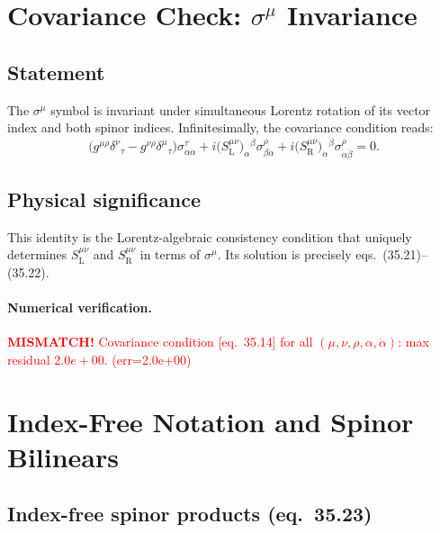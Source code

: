 \documentclass[12pt]{article}
\begin{document}
\section{Covariance Check: \texorpdfstring{$\sigma^\mu$}{sigma\^{}mu}
         Invariance \quad [eq.~35.14]}

\subsection{Statement}

The $\sigma^\mu$ symbol is invariant under simultaneous Lorentz
rotation of its vector index and both spinor indices.
Infinitesimally, the covariance condition reads:
\begin{equation}
  \bigl(g^{\mu\rho}\delta^{\nu}{}_\tau - g^{\nu\rho}\delta^{\mu}{}_\tau\bigr)
  \sigma^\tau_{\alpha\dot\alpha}
  + i\bigl(S^{\mu\nu}_{\mathrm{L}}\bigr)_\alpha{}^\beta
    \sigma^\rho_{\beta\dot\alpha}
  + i\bigl(S^{\mu\nu}_{\mathrm{R}}\bigr)_{\dot\alpha}{}^{\dot\beta}
    \sigma^\rho_{\alpha\dot\beta}
  = 0.
  \tag{35.14}
\end{equation}

\subsection{Physical significance}

This identity is the Lorentz-algebraic consistency condition that uniquely
determines $S^{\mu\nu}_{\mathrm{L}}$ and $S^{\mu\nu}_{\mathrm{R}}$ in
terms of $\sigma^\mu$.  Its solution is precisely eqs.~(35.21)--(35.22).

\paragraph{Numerical verification.}
\textcolor{red}{\textbf{MISMATCH!} Covariance condition [eq.~35.14] for all $(\mu,\nu,\rho,\alpha,\dot\alpha)$: max residual $2.0e+00$. (err=2.0e+00)}

\section{Index-Free Notation and Spinor Bilinears \quad [eq.~35.23--35.29]}

\subsection{Index-free spinor products (eq.~35.23)}
\end{document}
